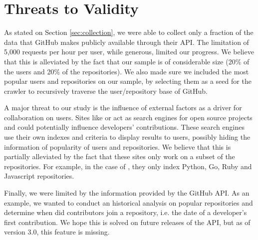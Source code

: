 
\section{Threats to Validity}
\label{sec:threats}

As stated on Section \ref{sec:collection}, we were able to collect only a fraction of the data that GitHub makes publicly available through their API. The limitation of 5,000 requests per hour per user, while generous, limited our progress. We believe that this is alleviated by the fact that our sample is of considerable size (20\% of the users and 20\% of the repositories). We also made sure we included the most popular users and repositories on our sample, by selecting them as a seed for the crawler to recursively traverse the user/repository base of GitHub.

A major threat to our study is the influence of external factors as a driver for collaboration on users. Sites like \cite{SourceGraph} or \cite{OhLoh} act as search engines for open source projects and could potentially influence developers' contributions. These search engines use their own indexes and criteria to display results to users, possibly hiding the information of popularity of users and repositories. We believe that this is partially alleviated by the fact that these sites only work on a subset of the repositories. For example, in the case of \cite{SourceGraph}, they only index Python, Go, Ruby and Javascript repositories.

Finally, we were limited by the information provided by the GitHub API. As an example, we wanted to conduct an historical analysis on popular repositories and determine when did contributors join a repository, i.e. the date of a developer's first contribution. We hope this is solved on future releases of the API, but as of version 3.0, this feature is missing.
